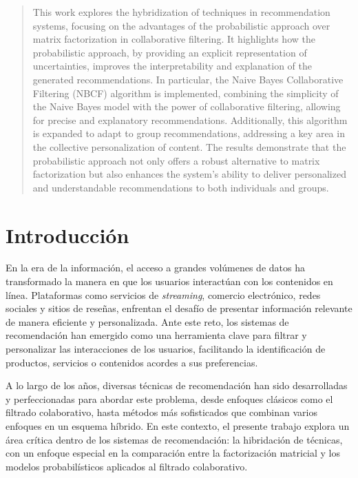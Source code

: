 \documentclass[runningheads,a4paper]{llncs}
\newenvironment{englishabstract}{%
    \renewcommand{\abstractname}{Abstract}%
    \begin{abstract}%
}{%
    \end{abstract}%
}
\begin{document}
\begin{englishabstract}
  This work explores the hybridization of techniques 
  in recommendation systems, focusing on the 
  advantages of the probabilistic approach over 
  matrix factorization in collaborative filtering. 
  It highlights how the probabilistic approach, 
  by providing an explicit representation of 
  uncertainties, improves the interpretability and 
  explanation of the generated recommendations. 
  In particular, the Naive Bayes Collaborative 
  Filtering (NBCF) algorithm is implemented, 
  combining the simplicity of the Naive Bayes model 
  with the power of collaborative filtering, 
  allowing for precise and explanatory 
  recommendations. Additionally, this algorithm is 
  expanded to adapt to group recommendations, 
  addressing a key area in the collective 
  personalization of content. The results 
  demonstrate that the probabilistic approach not 
  only offers a robust alternative to matrix 
  factorization but also enhances the system's 
  ability to deliver personalized and understandable 
  recommendations to both individuals and groups.
\end{englishabstract}

\section{Introducción}


En la era de la información, el acceso a 
grandes volúmenes de datos ha transformado la 
manera en que los usuarios interactúan con los 
contenidos en línea. Plataformas como servicios 
de \textit{streaming}, comercio electrónico, 
redes sociales y sitios de reseñas, enfrentan el 
desafío de presentar información relevante de manera 
eficiente y personalizada. Ante este reto, los 
sistemas de recomendación han emergido como una 
herramienta clave para filtrar y personalizar las interacciones de los usuarios, facilitando la identificación de productos, servicios o contenidos acordes a sus preferencias.

A lo largo de los años, diversas técnicas de recomendación han sido desarrolladas y perfeccionadas para abordar este problema, desde enfoques clásicos como el filtrado colaborativo, hasta métodos más sofisticados que combinan varios enfoques en un esquema híbrido. En este contexto, el presente trabajo explora un área crítica dentro de los sistemas de recomendación: la hibridación de técnicas, con un enfoque especial en la comparación entre la factorización matricial y los modelos probabilísticos aplicados al filtrado colaborativo.
\end{document}
